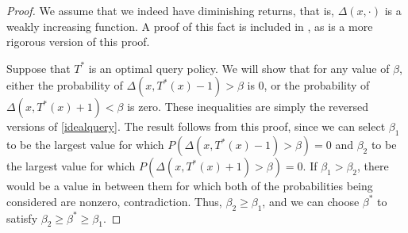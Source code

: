 \documentclass{scrartcl}
\begin{document}
\begin{proof}
We assume that we indeed have diminishing returns, that is, $\Delta(x, \cdot)$ is a weakly increasing function. 
A proof of this fact is included in \cite{cpqpaper}, as is a more rigorous version of this proof. \medskip

Suppose that $T^*$ is an optimal query policy. We will show that for any value of $\beta$, 
either the probability of $\Delta(x, T^*(x) - 1) > \beta$ is $0$, or the probability of $\Delta(x, T^*(x) + 1) < \beta$ is zero. 
These inequalities are simply the reversed versions of \eqref{idealquery}. The result follows from this proof, since we can select $\beta_1$ to be the largest value for which $P(\Delta(x, T^*(x) - 1) > \beta) = 0$ and $\beta_2$ to be the largest value for which $P(\Delta(x, T^*(x) + 1) > \beta) = 0$. If $\beta_1 > \beta_2$, there would be a value in between them for which both of the probabilities being considered are nonzero, contradiction. Thus, $\beta_2 \ge \beta_1$, and we can choose $\beta^*$ to satisfy $\beta_2 \ge \beta^* \ge \beta_1$. \medskip


\end{proof}
\end{document}
